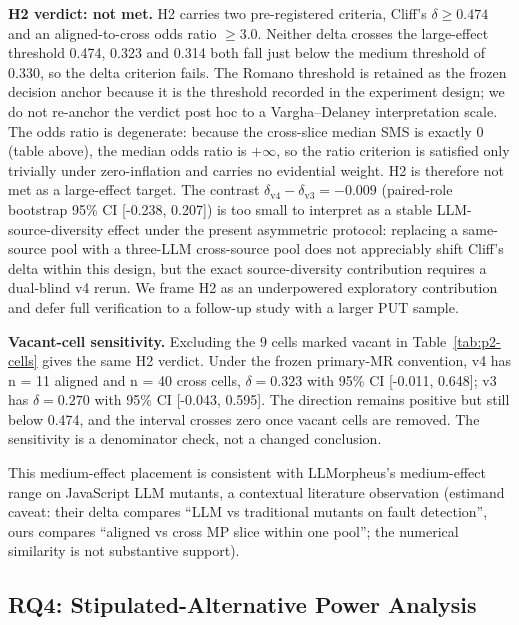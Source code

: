 \documentclass[manuscript,screen,review]{acmart}
\begin{document}
\textbf{H2 verdict: not met.} H2 carries two pre-registered criteria,
Cliff's $\delta \geq 0.474$ and an aligned-to-cross odds ratio
$\geq 3.0$. Neither delta crosses the \citet{romano2006cliff}
large-effect threshold 0.474, 0.323 and 0.314 both fall just below the
\citet{romano2006cliff} medium threshold of 0.330, so the delta criterion fails. The
Romano threshold is retained as the frozen decision anchor because it is
the threshold recorded in the experiment design; we do not re-anchor the
verdict post hoc to a Vargha--Delaney interpretation scale. The
odds ratio is degenerate: because the cross-slice median SMS is exactly
0 (table above), the median odds ratio is $+\infty$, so the ratio
criterion is satisfied only trivially under zero-inflation and carries no
evidential weight. H2 is therefore not met as a large-effect target. The
contrast $\delta_{\mathrm{v4}} - \delta_{\mathrm{v3}} = -0.009$ (paired-role
bootstrap 95\% CI {[}-0.238, 0.207{]}) is too small to interpret as a stable LLM-source-diversity effect
under the present asymmetric protocol: replacing a same-source pool with
a three-LLM cross-source pool does not appreciably shift Cliff's delta
within this design, but the exact source-diversity contribution requires
a dual-blind v4 rerun. We frame H2 as an underpowered exploratory
contribution and defer full verification to a follow-up study with a
larger PUT sample.

\textbf{Vacant-cell sensitivity.} Excluding the 9 cells marked vacant in
Table~\ref{tab:p2-cells} gives the same H2 verdict. Under the frozen
primary-MR convention, v4 has n = 11 aligned and n = 40 cross cells,
$\delta = 0.323$ with 95\% CI {[}-0.011, 0.648{]}; v3 has
$\delta = 0.270$ with 95\% CI {[}-0.043, 0.595{]}. The direction remains
positive but still below 0.474, and the interval crosses zero once vacant
cells are removed. The sensitivity is a denominator check, not a changed
conclusion.

This medium-effect placement is consistent with \citet{tip2025llmorpheus}
LLMorpheus's medium-effect range on JavaScript LLM mutants, a contextual
literature observation (estimand caveat: their delta compares ``LLM vs
traditional mutants on fault detection'', ours compares ``aligned vs
cross MP slice within one pool''; the numerical similarity is not
substantive support).

\subsection{RQ4: Stipulated-Alternative Power Analysis}\label{rq2-stipulated-alternative-power}
\end{document}
